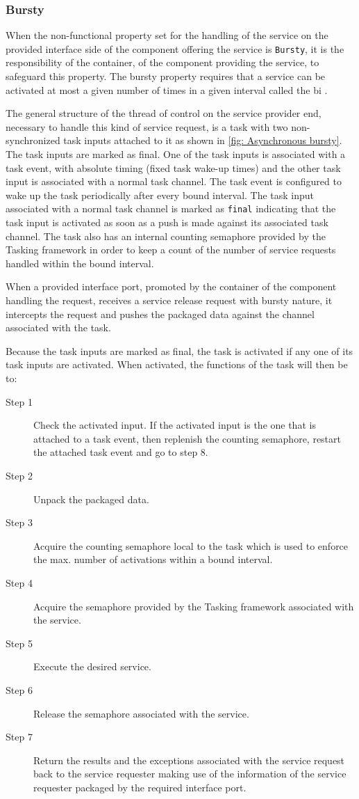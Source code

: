 \subsubsection{\textbf{Bursty}}
When the non-functional property set for the handling of the service on the provided interface side of the component offering the service is \texttt{Bursty}, it is the responsibility of the container, of the component providing the service, to safeguard this property. The bursty property requires that a service can be activated at most a given number of times in a given interval called the \ac{bi} \cite{SpecMetamodel}\cite{CompBasedProcess}.

The general structure of the thread of control on the service provider end, necessary to handle this kind of service request, is a task with two non-synchronized task inputs attached to it as shown in \cref{fig: Asynchronous bursty}. The task inputs are marked as final. One of the task inputs is associated with a task event, with absolute timing (fixed task wake-up times) and the other task input is associated with a normal task channel. The task event is configured to wake up the task periodically after every bound interval. The task input associated with a normal task channel is marked as \texttt{final} indicating that the task input is activated as soon as a push is made against its associated task channel. The task also has an internal counting semaphore provided by the Tasking framework in order to keep a count of the number of service requests handled within the bound interval.

When a provided interface port, promoted by the container of the component handling the request, receives a service release request with bursty nature, it intercepts the request and pushes the packaged data against the channel associated with the task.
  
Because the task inputs are marked as final, the task is activated if any one of its task inputs are activated. When activated, the functions of the task will then be to:

\begin{description}
\item [Step 1] Check the activated input. If the activated input is the one that is attached to a task event, then replenish the counting semaphore, restart the attached task event and go to step 8. 
\item [Step 2] Unpack the packaged data.
\item [Step 3] Acquire the counting semaphore local to the task which is used to enforce the max. number of activations within a bound interval.
\item [Step 4] Acquire the semaphore provided by the Tasking framework associated with the service.
\item [Step 5] Execute the desired service.
\item [Step 6] Release the semaphore associated with the service. 
\item [Step 7]Return the results and the exceptions associated with the service request back to the service requester making use of the information of the service requester packaged by the required interface port. 
\end{description}


